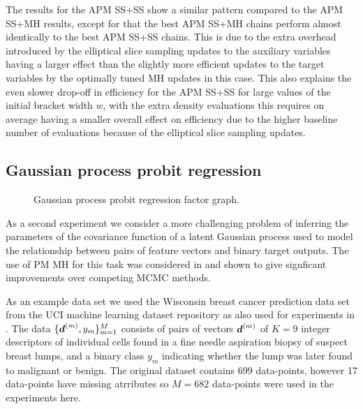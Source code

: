 The results for the \ac{APM} \ac{SS}+\ac{SS} show a similar pattern compared to the \ac{APM} \ac{SS}+\ac{MH} results, except for that the best \ac{APM} \ac{SS}+\ac{MH} chains perform almost identically to the best \ac{APM} \ac{SS}+\ac{SS} chains. This is due to the extra overhead introduced by the elliptical slice sampling updates to the auxiliary variables having a larger effect than the slightly more efficient updates to the target variables by the optimally tuned \ac{MH} updates in this case. This also explains the even slower drop-off in efficiency for the \ac{APM} \ac{SS}+\ac{SS} for large values of the initial bracket width $w$, with the extra density evaluations this requires on average having a smaller overall effect on efficiency due to the higher baseline number of evaluations because of the elliptical slice sampling updates.

\subsection{Gaussian process probit regression}\label{subsec:pm-gaussian-process-classifier-exp}

\begin{figure}[!t]
\centering
{}
\caption{Gaussian process probit regression factor graph.}
\label{fig:gaussian-process-probit-regression-factor-graph}
\end{figure}

As a second experiment we consider a more challenging problem of inferring the parameters of the covariance function of a latent Gaussian process used to model the relationship between pairs of feature vectors and binary target outputs. The use of \ac{PM} \ac{MH} for this task was considered in \citep{filippone2014pseudo} and shown to give signficant improvements over competing \ac{MCMC} methods. 

As an example data set we used the Wisconsin breast cancer prediction data set \citep{mangasarian1995breast} from the UCI machine learning dataset repository \citep{lichman2013uci} as also used for experiments in \citep{filippone2014pseudo}. The data $\lbrace \boldsymbol{d}^{(m)},y_m \rbrace_{m=1}^M$ consists of pairs of vectors $\boldsymbol{d}^{(m)}$ of $K=9$ integer descriptors of individual cells found in a fine needle aspiration biopsy of suspect breast lumps, and a binary class $y_m$ indicating whether the lump was later found to malignant or benign. The original dataset contains 699 data-points, however 17 data-points have missing atrributes so $M=682$ data-points were used in the experiments here.

